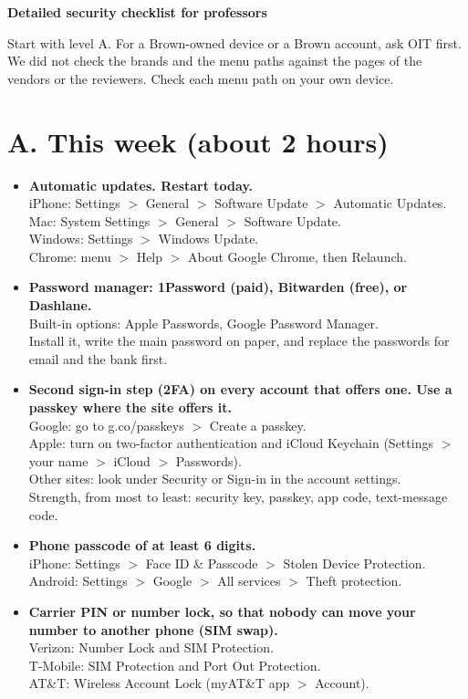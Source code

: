 \documentclass[10pt]{article}
\begin{document}
{\LARGE\sffamily\bfseries\color{brownred} Detailed security checklist for professors}\par
\smallskip
\medskip
Start with level A. For a Brown-owned device or a Brown account, ask OIT first. We did not check the brands and the menu paths against the pages of the vendors or the reviewers. Check each menu path on your own device.

\section{A. This week (about 2 hours)}
\begin{itemize}
\item \textbf{Automatic updates. Restart today.}\\{\small iPhone: Settings $>$ General $>$ Software Update $>$ Automatic Updates.\\ Mac: System Settings $>$ General $>$ Software Update.\\ Windows: Settings $>$ Windows Update.\\ Chrome: menu $>$ Help $>$ About Google Chrome, then Relaunch.}
\item \textbf{Password manager: 1Password (paid), Bitwarden (free), or Dashlane.}\\{\small Built-in options: Apple Passwords, Google Password Manager.\\ Install it, write the main password on paper, and replace the passwords for email and the bank first.}
\item \textbf{Second sign-in step (2FA) on every account that offers one. Use a passkey where the site offers it.}\\{\small Google: go to g.co/passkeys $>$ Create a passkey.\\ Apple: turn on two-factor authentication and iCloud Keychain (Settings $>$ your name $>$ iCloud $>$ Passwords).\\ Other sites: look under Security or Sign-in in the account settings.\\ Strength, from most to least: security key, passkey, app code, text-message code.}
\item \textbf{Phone passcode of at least 6 digits.}\\{\small iPhone: Settings $>$ Face ID \& Passcode $>$ Stolen Device Protection.\\ Android: Settings $>$ Google $>$ All services $>$ Theft protection.}
\item \textbf{Carrier PIN or number lock, so that nobody can move your number to another phone (SIM swap).}\\{\small Verizon: Number Lock and SIM Protection.\\ T-Mobile: SIM Protection and Port Out Protection.\\ AT\&T: Wireless Account Lock (myAT\&T app $>$ Account).}

\end{itemize}
\end{document}
